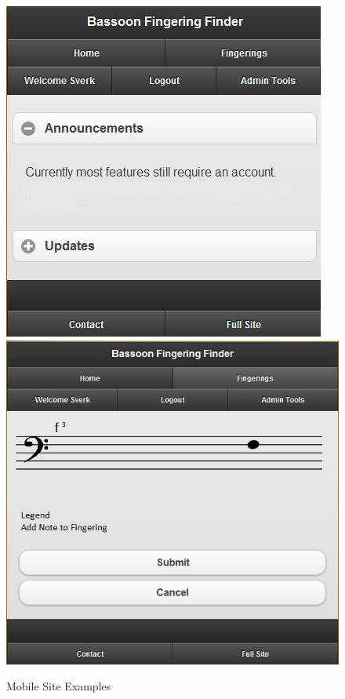 \documentclass[12pt,english]{article}
\begin{document}
\begin{figure}[H]


\caption{Mobile Site Examples}


\begin{centering}
\includegraphics[scale=0.6]{2.JPG}\qquad{}\includegraphics[scale=0.48]{6.JPG}
\par\end{centering}

\end{figure}
\end{document}
